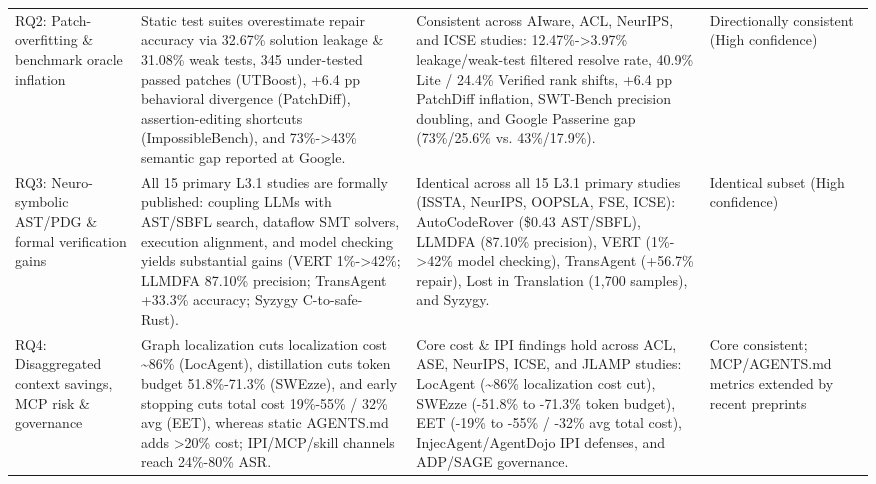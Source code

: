 \documentclass[10pt,twocolumn,a4paper]{article}
\begin{document}
\begin{table}[t!]
\begin{tabularx}{\textwidth}{>{\raggedright\arraybackslash}p{2.75cm} X X >{\raggedright\arraybackslash}p{2.45cm}}
RQ2: Patch-overfitting \& benchmark oracle inflation & Static test suites overestimate repair accuracy via 32.67\% solution leakage \& 31.08\% weak tests, 345 under-tested passed patches (UTBoost), +6.4 pp behavioral divergence (PatchDiff), assertion-editing shortcuts (ImpossibleBench), and 73\%->43\% semantic gap reported at Google.~\cite{aleithan2026swebench,yu2025utboost,wang2025solved,rondon2025evaluating,mndlersasahara2024swtbench,zhong2025impossiblebench} & Consistent across AIware, ACL, NeurIPS, and ICSE studies: 12.47\%->3.97\% leakage/weak-test filtered resolve rate, 40.9\% Lite / 24.4\% Verified rank shifts, +6.4 pp PatchDiff inflation, SWT-Bench precision doubling, and Google Passerine gap (73\%/25.6\% vs. 43\%/17.9\%).~\cite{aleithan2026swebench,yu2025utboost,wang2025solved,rondon2025evaluating,mndlersasahara2024swtbench} & Directionally consistent (High confidence) \\
RQ3: Neuro-symbolic AST/PDG \& formal verification gains & All 15 primary L3.1 studies are formally published: coupling LLMs with AST/SBFL search, dataflow SMT solvers, execution alignment, and model checking yields substantial gains (VERT 1\%->42\%; LLMDFA 87.10\% precision; TransAgent +33.3\% accuracy; Syzygy C-to-safe-Rust).~\cite{zhang2024autocoderover,wang2024llmdfa,yang2024vert,shetty2025syzygy,yuan2024transagent,pan2024lost} & Identical across all 15 L3.1 primary studies (ISSTA, NeurIPS, OOPSLA, FSE, ICSE): AutoCodeRover (\$0.43 AST/SBFL), LLMDFA (87.10\% precision), VERT (1\%->42\% model checking), TransAgent (+56.7\% repair), Lost in Translation (1,700 samples), and Syzygy.~\cite{zhang2024autocoderover,wang2024llmdfa,yang2024vert,shetty2025syzygy,yuan2024transagent,pan2024lost} & Identical subset (High confidence) \\
RQ4: Disaggregated context savings, MCP risk \& governance & Graph localization cuts localization cost \textasciitilde{}86\% (LocAgent), distillation cuts token budget 51.8\%-71.3\% (SWEzze), and early stopping cuts total cost 19\%-55\% / 32\% avg (EET), whereas static AGENTS.md adds >20\% cost; IPI/MCP/skill channels reach 24\%-80\% ASR.~\cite{chen2025locagent,jia2026compressing,guo2026eet,gloaguen2026evaluating,zhan2024injecagent,zhang2025mcp,schmotz2026skillinject,arora2026specifying,feng2026sage} & Core cost \& IPI findings hold across ACL, ASE, NeurIPS, ICSE, and JLAMP studies: LocAgent (\textasciitilde{}86\% localization cost cut), SWEzze (-51.8\% to -71.3\% token budget), EET (-19\% to -55\% / -32\% avg total cost), InjecAgent/AgentDojo IPI defenses, and ADP/SAGE governance.~\cite{chen2025locagent,jia2026compressing,guo2026eet,zhan2024injecagent,andriushchenko2024agentdojo,arora2026specifying,ciancarini2026charge,feng2026sage} & Core consistent; MCP/AGENTS.md metrics extended by recent preprints \\
\bottomrule
\end{tabularx}
\end{table}
\end{document}
